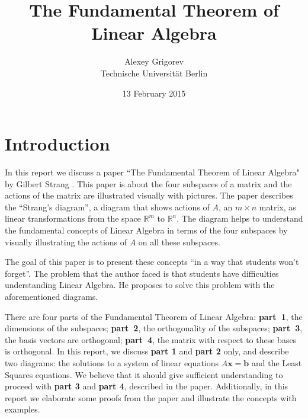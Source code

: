 \documentclass{acm_proc_article-sp}
\begin{document}
\newtheorem{prop}{Proposition}

\title{The Fundamental Theorem of Linear Algebra}


\author{
  \alignauthor
  Alexey Grigorev\\
  Technische Universit\"at Berlin \\
}

\date{13 February 2015}


\maketitle


\section{Introduction}

In this report we discuss a paper ``The Fundamental Theorem of Linear Algebra" by
Gilbert Strang \cite{strang1993fundamental}. This paper is about the four
subspaces of a matrix and the actions of the matrix are illustrated visually with pictures.
The paper describes the ``Strang's diagram'', a diagram that shows
actions of \(A\), an \(m \times n\) matrix, as linear transformations
from the space \(\mathbb R^m\) to \(\mathbb R^n\). The diagram helps to
understand the fundamental concepts of Linear Algebra in terms of the
four subspaces by visually illustrating the actions of \(A\) on all
these subspaces.

The goal of this paper is to present these concepts ``in a way that
students won't forget''. The problem that the author faced is that
students have difficulties understanding Linear Algebra.
He proposes to solve this problem with the aforementioned diagrams.


There are four parts of the Fundamental Theorem of Linear Algebra: \textbf{part~1}, the dimensions of the subspaces; \textbf{part~2}, the orthogonality of the subspaces; \textbf{part~3}, the basis vectors are orthogonal; \textbf{part~4}, the matrix with respect to these bases is orthogonal. In this report, we discuss \textbf{part 1} and \textbf{part 2} only,
and describe two diagrams: the solutions to a system of linear equations
\(A \mathbf x = \mathbf b\) and the Least Squares equations. We believe
that it should give sufficient understanding to proceed with
\textbf{part 3} and \textbf{part 4}, described in the paper. Additionally,
in this report we elaborate some proofs from the paper and illustrate
the concepts with examples.
\end{document}
